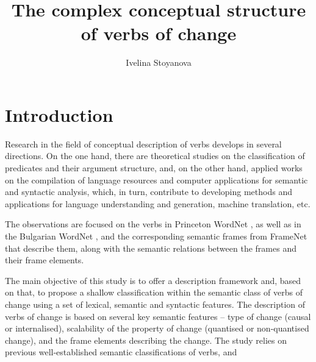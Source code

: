 \documentclass[output=paper,colorlinks,citecolor=brown]{langscibook}
\author{Ivelina Stoyanova\orcid{0000-0003-3771-435X}\affiliation{Department of Computational Linguistics, Institute for Bulgarian Language, Bulgarian Academy of Sciences}
}
\title{The complex conceptual structure of verbs of change}
\begin{document}
\maketitle

\section{Introduction}

Research in the field of conceptual description of verbs develops in several directions. On the one hand, there are theoretical studies on the classification of predicates and their argument structure, and, on the other hand, applied works on the compilation of language resources and computer applications for semantic and syntactic analysis, which, in turn, contribute to developing methods and applications for language understanding and generation, machine translation, etc.

The observations are focused on the verbs in Princeton WordNet \citep{Fellbaum1998}, as well as in the Bulgarian WordNet \citep{Koeva2010-wordnet,koeva2021-wordnet}, and the corresponding semantic frames from FrameNet \citep{Baker1998} that describe them, along with the semantic relations between the frames and their frame elements. 

The main objective of this study is to offer a description framework and, based on that, to propose a shallow classification within the semantic class of verbs of change using a set of lexical, semantic and syntactic features. The description of verbs of change is based on several key semantic features -- type of change (causal or internalised), scalability of the property of change (quantised or non-quantised change), and the frame elements describing the change. The study relies on previous well-established semantic classifications of verbs, and 
\end{document}
